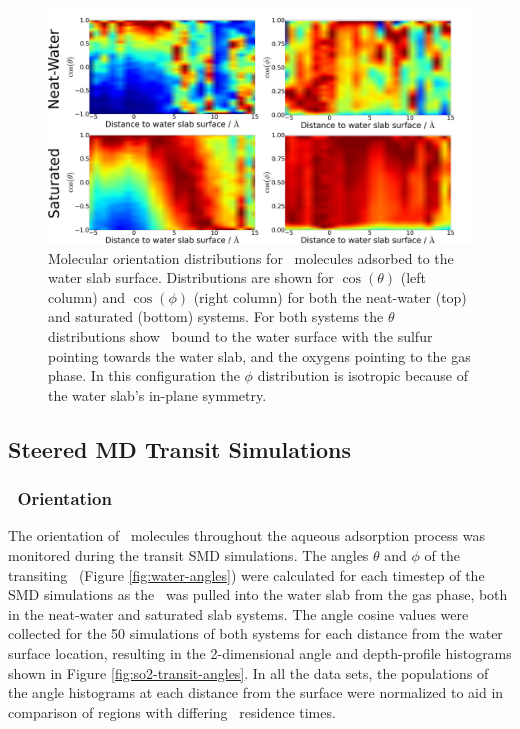 \documentclass{article}
\begin{document}
\begin{figure}[h!]
	\begin{center}
		\includegraphics[scale=1.0]{images/so2-angles.png}
		\caption{Molecular orientation distributions for \suldiox~molecules adsorbed to the water slab surface. Distributions are shown for $\cos(\theta)$ (left column) and $\cos(\phi)$ (right column) for both the neat-water (top) and saturated (bottom) systems. For both systems the $\theta$ distributions show \suldiox~bound to the water surface with the sulfur pointing towards the water slab, and the oxygens pointing to the gas phase. In this configuration the $\phi$ distribution is isotropic because of the water slab's in-plane symmetry.}
		\label{fig:so2-orientation}
	\end{center}
\end{figure}

\subsection{Steered MD Transit Simulations}

\subsubsection {\suldiox~Orientation}

	The orientation of \suldiox~molecules throughout the aqueous adsorption process was monitored during the transit SMD simulations. The angles $\theta$ and $\phi$ of the transiting \suldiox~(Figure \ref{fig:water-angles}) were calculated for each timestep of the SMD simulations as the \suldiox~was pulled into the water slab from the gas phase, both in the neat-water and saturated slab systems. The angle cosine values were collected for the 50 simulations of both systems for each distance from the water surface location, resulting in the 2-dimensional angle and depth-profile histograms shown in Figure \ref{fig:so2-transit-angles}. In all the data sets, the populations of the angle histograms at each distance from the surface were normalized to aid in comparison of regions with differing \suldiox~residence times.
\end{document}

